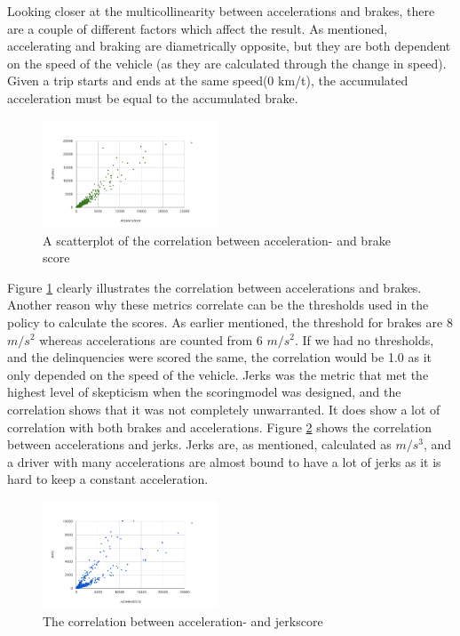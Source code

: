 Looking closer at the multicollinearity between accelerations and brakes, there are a couple of different factors which affect the result. As mentioned, accelerating and braking are diametrically opposite, but they are both dependent on the speed of the vehicle (as they are calculated through the change in speed). Given a trip starts and ends at the same speed(0 km/t), the accumulated acceleration must be equal to the accumulated brake.

\begin{figure}[tb]
\centering
\includegraphics[width=0.465\textwidth]{Pictures/abcorrel}
\caption{A scatterplot of the correlation between acceleration- and brake score}
\label{fig:abcorrel}
\end{figure}

Figure \ref{fig:abcorrel} clearly illustrates the correlation between accelerations and brakes. Another reason why these metrics correlate can be the thresholds used in the policy to calculate the scores. As earlier mentioned, the threshold for brakes are 8 $m/s^2$ whereas accelerations are counted from 6 $m/s^2$. If we had no thresholds, and the delinquencies were scored the same, the correlation would be 1.0 as it only depended on the speed of the vehicle. 
Jerks was the metric that met the highest level of skepticism when the scoringmodel was designed, and the correlation shows that it was not completely unwarranted. It does show a lot of correlation with both brakes and accelerations. Figure \ref{fig:ajcorrel} shows the correlation between accelerations and jerks. Jerks are, as mentioned, calculated as $m/s^3$, and a driver with many accelerations are almost bound to have a lot of jerks as it is hard to keep a constant acceleration.

\begin{figure}[tb]
\centering
\includegraphics[width=0.465\textwidth]{Pictures/ajcorrel}
\caption{The correlation between acceleration- and jerkscore}
\label{fig:ajcorrel}
\end{figure}